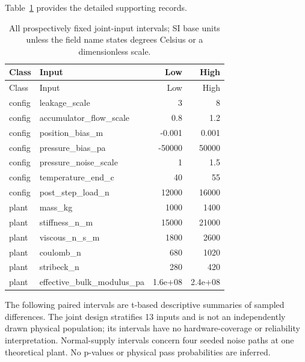 \documentclass[11pt,a4paper]{article}
\begin{document}
\begingroup\hypersetup{hypertexnames=true}\small\setlength{\tabcolsep}{4pt}
Table~\ref{supp:longtable:3} provides the detailed supporting records.
\begin{longtable}{llrr}
\caption{All prospectively fixed joint-input intervals; SI base units unless the field name states degrees Celsius or a dimensionless scale.}\label{supp:longtable:3}\\\toprule
Class & Input & Low & High\\\midrule\endfirsthead
\toprule
Class & Input & Low & High\\\midrule\endhead
config & leakage\_scale & 3 & 8\\
config & accumulator\_flow\_scale & 0.8 & 1.2\\
config & position\_bias\_m & -0.001 & 0.001\\
config & pressure\_bias\_pa & -50000 & 50000\\
config & pressure\_noise\_scale & 1 & 1.5\\
config & temperature\_end\_c & 40 & 55\\
config & post\_step\_load\_n & 12000 & 16000\\
plant & mass\_kg & 1000 & 1400\\
plant & stiffness\_n\_m & 15000 & 21000\\
plant & viscous\_n\_s\_m & 1800 & 2600\\
plant & coulomb\_n & 680 & 1020\\
plant & stribeck\_n & 280 & 420\\
plant & effective\_bulk\_modulus\_pa & 1.6e+08 & 2.4e+08\\
\bottomrule\end{longtable}\endgroup

The following paired intervals are t-based descriptive summaries of sampled differences. The joint design stratifies 13 inputs and is not an independently drawn physical population; its intervals have no hardware-coverage or reliability interpretation. Normal-supply intervals concern four seeded noise paths at one theoretical plant. No p-values or physical pass probabilities are inferred.
\end{document}
